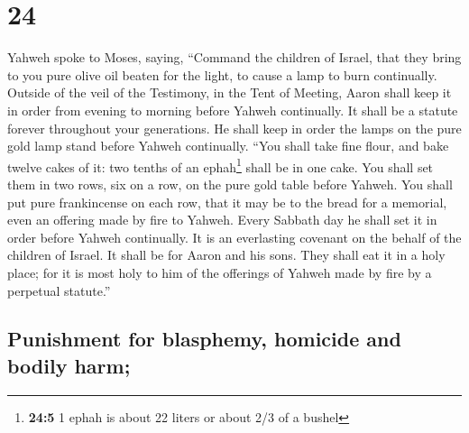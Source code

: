 \hypertarget{section-23}{%
\section{24}\label{section-23}}

 Yahweh spoke to Moses, saying,  ``Command
the children of Israel, that they bring to you pure olive oil beaten for
the light, to cause a lamp to burn continually.  Outside
of the veil of the Testimony, in the Tent of Meeting, Aaron shall keep
it in order from evening to morning before Yahweh continually. It shall
be a statute forever throughout your generations.  He
shall keep in order the lamps on the pure gold lamp stand before Yahweh
continually.  ``You shall take fine flour, and bake twelve
cakes of it: two tenths of an ephah\footnote{\textbf{24:5} 1 ephah is
  about 22 liters or about 2/3 of a bushel} shall be in one cake.
 You shall set them in two rows, six on a row, on the pure
gold table before Yahweh.  You shall put pure frankincense
on each row, that it may be to the bread for a memorial, even an
offering made by fire to Yahweh.  Every Sabbath day he
shall set it in order before Yahweh continually. It is an everlasting
covenant on the behalf of the children of Israel.  It
shall be for Aaron and his sons. They shall eat it in a holy place; for
it is most holy to him of the offerings of Yahweh made by fire by a
perpetual statute.''

\hypertarget{punishment-for-blasphemy-homicide-and-bodily-harm}{%
\subsection{Punishment for blasphemy, homicide and bodily
harm;}\label{punishment-for-blasphemy-homicide-and-bodily-harm}}

